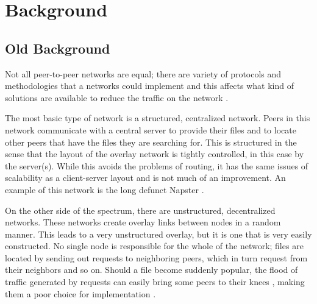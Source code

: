 \documentclass[conference, compsocconf, letterpaper]{IEEEtran}
\begin{document}





\section{Background}


\subsection{Old Background}
Not all peer-to-peer networks are equal; there are variety of protocols and methodologies that a networks could implement and this affects what kind of solutions are available to reduce the traffic on the network    \cite{SurveyCompare} \cite{Overview}.

The most basic type of network is a structured, centralized  network.  Peers in this network communicate with a central server to provide their files and to locate other peers that have the files they are searching for.  This is structured in the sense that the layout of the overlay network is tightly controlled, in this case by the server(s). While this avoids the problems of routing, it has the same issues of scalability as a client-server layout and is not much of an improvement. An example of this network is the long defunct Napster  \cite{SurveyCompare} \cite{Overview}.

On the other side of the spectrum, there are unstructured, decentralized networks.  These networks create overlay links between nodes in a random manner. This leads to a very unstructured overlay, but it is one that is very easily constructed.  No single node is responsible for the whole of the network;  files are located by sending out requests to neighboring peers, which in turn request from their neighbors and so on. Should a file become suddenly popular, the flood of traffic generated by requests can easily bring some peers to their knees \cite{Lv:2002:SRU:514191.514206}, making them a poor choice for implementation \cite{Overview}.
\end{document}
